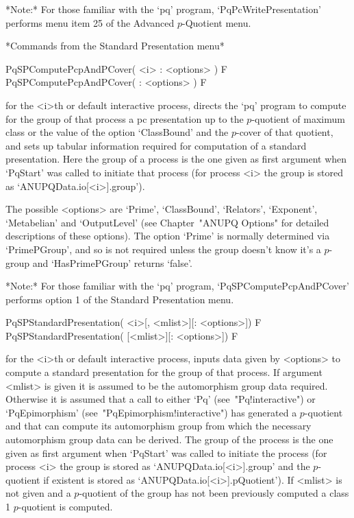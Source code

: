 *Note:* For those familiar with the `pq' program, `PqPcWritePresentation'
performs menu item 25 of the Advanced $p$-Quotient menu.

%
%
%
%

*Commands from the Standard Presentation menu*

\>PqSPComputePcpAndPCover( <i> : <options> ) F
\>PqSPComputePcpAndPCover( : <options> ) F

for the <i>th or default interactive {\ANUPQ} process, directs  the  `pq'
program to compute for the group of that process a pc presentation  up  to
the $p$-quotient of maximum class or the value of the option `ClassBound'
and the $p$-cover of that  quotient,  and  sets  up  tabular  information
required for computation of a standard presentation. Here the group of  a
process is the one given as first argument when `PqStart' was  called  to
initiate  that  process  (for  process  <i>  the  group  is   stored   as
`ANUPQData.io[<i>].group').

The possible <options> are `Prime', `ClassBound', `Relators', `Exponent',
`Metabelian' and `OutputLevel' (see Chapter~"ANUPQ Options" for  detailed
descriptions of these options). The option `Prime' is normally determined
via `PrimePGroup', and so is not required unless the group  doesn't  know
it's a $p$-group and `HasPrimePGroup' returns `false'.

*Note:*
For  those  familiar  with  the  `pq'  program,  `PqSPComputePcpAndPCover'
performs option 1 of the Standard Presentation menu.

\>PqSPStandardPresentation( <i>[, <mlist>][: <options>]) F
\>PqSPStandardPresentation( [<mlist>][: <options>]) F

for the <i>th or default interactive {\ANUPQ} process, inputs data  given
by <options> to compute a standard presentation for  the  group  of  that
process.  If  argument  <mlist>  is  given  it  is  assumed  to  be   the
automorphism group data required. Otherwise it is assumed that a call  to
either      `Pq'      (see~"Pq!interactive")      or      `PqEpimorphism'
(see~"PqEpimorphism!interactive") has generated a $p$-quotient  and  that
{\GAP} can compute  its  automorphism  group  from  which  the  necessary
automorphism group data can be derived. The group of the process  is  the
one given as first argument when `PqStart' was  called  to  initiate  the
process (for process <i> the group is stored as `ANUPQData.io[<i>].group'
and     the     $p$-quotient     if     existent     is     stored     as
`ANUPQData.io[<i>].pQuotient').  If  <mlist>   is   not   given   and   a
$p$-quotient of the group has not been  previously  computed  a  class  1
$p$-quotient is computed.

